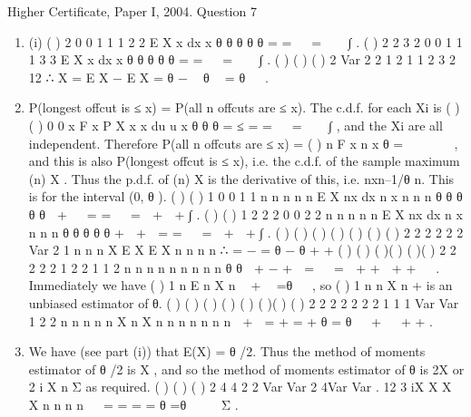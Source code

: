 \documentclass[a4paper,12pt]{article}
\begin{document}
Higher Certificate, Paper I, 2004. Question 7

\begin{enumerate}
\item (i) ( ) 2
0
0
1 1 1
2 2
E X x dx x
θ
θ θ
θ θ
= =   =   ∫ .
( ) 2
2 3 2
0
0
1 1 1
3 3
E X x dx x
θ
θ θ
θ θ
= =   =   ∫ .
( ) ( ) { ( )}
2
Var 2 2 1 2 1 1 2
3 2 12
∴ X = E X − E X = θ −  θ  = θ
 
.
\item  P(longest offcut is ≤ x) = P(all n offcuts are ≤ x).
The c.d.f. for each Xi is ( ) ( ) 0
0
x
F x P X x x du u x
θ θ θ
= ≤ = =   =   ∫ , and the Xi are all
independent. Therefore P(all n offcuts are ≤ x) = { ( )}
n
F x n x
θ
=    
 
, and this is also
P(longest offcut is ≤ x), i.e. the c.d.f. of the sample maximum (n) X . Thus the p.d.f. of
(n) X is the derivative of this, i.e. nxn–1/θ n. This is for the interval (0, θ ).
( ) ( ) 1
0
0 1 1
n n
n n n
E X nx dx n x n
n n
θ
θ θ
θ θ
 + 
∴ = =   =  +  + ∫ .
( ) ( ) 1 2 2
2
0
0 2 2
n n
n n n
E X nx dx n x n
n n
θ
θ θ
θ θ
+  + 
= =   =  +  + ∫ .
( ) ( ) ( ) ( ) ( ) { ( )} ( )
2 2 2 2
2
2 Var
2 1 n n n
X E X E X n n
n n
∴ = − = θ − θ
+ +
( ) ( )
( )( ) ( )( )
2 2
2
2 2
1 2
2 1 1 2
n n n n n
n n n n
θ θ
 + − + 
=   =
 + +  + +  
.
Immediately we have ( )
1
n
E n X
n
 +  =θ
 
, so ( )
1
n
n X
n
+ is an unbiased estimator of θ.
( ) ( )
( ) ( ) ( )
( )( ) ( )
2 2 2 2
2 2 2
1 1 1 Var Var
1 2 2 n
n n n n X n X
n n n n n n n
 +  = + = + θ = θ   +   + +
.
\item We have (see part (i)) that E(X) = θ /2. Thus the method of moments estimator
of θ /2 is X , and so the method of moments estimator of θ is 2X or 2
i X
n Σ as
required.
( ) ( ) ( )
2 4 4 2 2 Var Var 2 4Var Var .
12 3 iX X X X
n n n n
  = = = = θ =θ  
  Σ .
\end{enumerate}
\end{document}
